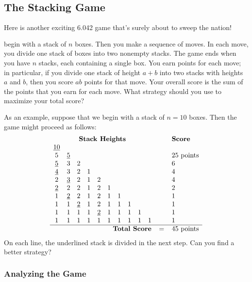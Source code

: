 \subsection{The Stacking Game}

Here is another exciting 6.042 game that's surely about to sweep the
nation!

 begin with a stack of $n$ boxes.  Then you
make a sequence of moves.  In each move, you divide one stack of boxes
into two nonempty stacks.  The game ends when you have $n$ stacks, each
containing a single box.  You earn points for each move; in particular, if
you divide one stack of height $a + b$ into two stacks with heights $a$
and $b$, then you score $ab$ points for that move.  Your overall score is
the sum of the points that you earn for each move.  What strategy should
you use to maximize your total score?

As an example, suppose that we begin with a stack of $n = 10$ boxes.
Then the game might proceed as follows:
%
\[
\begin{array}{cccccccccccl}
\multicolumn{10}{c}{\textbf{Stack Heights}} & \quad & \textbf{Score} \\
\underline{10}&&&&&&&&& && \\
5&\underline{5}&&&&&&&& && 25 \text{ points} \\
\underline{5}&3&2&&&&&&& && 6 \\
\underline{4}&3&2&1&&&&&& && 4 \\
2&\underline{3}&2&1&2&&&&& && 4 \\
\underline{2}&2&2&1&2&1&&&& && 2 \\
1&\underline{2}&2&1&2&1&1&&& && 1 \\
1&1&\underline{2}&1&2&1&1&1&& && 1 \\
1&1&1&1&\underline{2}&1&1&1&1& && 1 \\
1&1&1&1&1&1&1&1&1&1 && 1 \\ \hline
\multicolumn{10}{r}{\textbf{Total Score}} & = & 45 \text{ points}
\end{array}
\]
%
On each line, the underlined stack is divided in the next step.  Can
you find a better strategy?

\subsubsection{Analyzing the Game}


